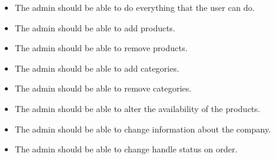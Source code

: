 \begin{itemize}
    \item The admin should be able to do everything that the user can do.
    \item The admin should be able to add products.
    \item The admin should be able to remove products. 
    \item The admin should be able to add categories. 
    \item The admin should be able to remove categories. 
    \item The admin should be able to alter the availability of the products. 
    \item The admin should be able to change information about the company.
    \item The admin should be able to change handle status on order.
\end{itemize}

